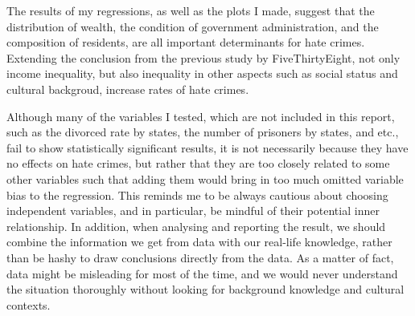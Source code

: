 \documentclass[]{article}
\begin{document}
The results of my regressions, as well as the plots I made, suggest that
the distribution of wealth, the condition of government administration,
and the composition of residents, are all important determinants for
hate crimes. Extending the conclusion from the previous study by
FiveThirtyEight, not only income inequality, but also inequality in
other aspects such as social status and cultural backgroud, increase
rates of hate crimes.

Although many of the variables I tested, which are not included in this
report, such as the divorced rate by states, the number of prisoners by
states, and etc., fail to show statistically significant results, it is
not necessarily because they have no effects on hate crimes, but rather
that they are too closely related to some other variables such that
adding them would bring in too much omitted variable bias to the
regression. This reminds me to be always cautious about choosing
independent variables, and in particular, be mindful of their potential
inner relationship. In addition, when analysing and reporting the
result, we should combine the information we get from data with our
real-life knowledge, rather than be hashy to draw conclusions directly
from the data. As a matter of fact, data might be misleading for most of
the time, and we would never understand the situation thoroughly without
looking for background knowledge and cultural contexts.
\end{document}
